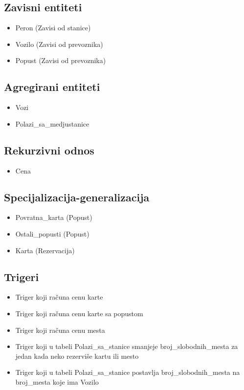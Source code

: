 \documentclass[12pt]{article}
\begin{document}
\subsection{Zavisni entiteti}
\begin{itemize}
	\item Peron (Zavisi od stanice)
	\item Vozilo (Zavisi od prevoznika)
	\item Popust (Zavisi od prevoznika)
\end{itemize}

\subsection{Agregirani entiteti}
\begin{itemize}
	\item Vozi
	\item Polazi\_sa\_medjustanice
\end{itemize}

\subsection{Rekurzivni odnos}
\begin{itemize}
	\item Cena
\end{itemize}

\subsection{Specijalizacija-generalizacija}
\begin{itemize}
	\item Povratna\_karta (Popust)
	\item Ostali\_popusti (Popust)
	\item Karta (Rezervacija)
\end{itemize}

\subsection{Trigeri}
\begin{itemize}
	\item Triger koji ra\v cuna cenu karte
	\item Triger koji ra\v cuna cenu karte sa popustom
	\item Triger koji ra\v cuna cenu mesta
	\item Triger koji u tabeli Polazi\_sa\_stanice smanjeje broj\_slobodnih\_mesta za jedan kada neko rezervi\v se kartu ili mesto
	\item Triger koji u tabeli Polazi\_sa\_stanice postavlja broj\_slobodnih\_mesta na broj\_mesta koje ima Vozilo
\end{itemize}
\end{document}
